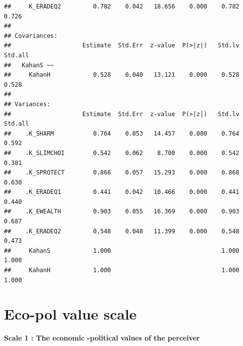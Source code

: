 \documentclass[
]{article}
\begin{document}
\begin{verbatim}
##     K_ERADEQ2         0.782    0.042   18.656    0.000    0.782    0.726
## 
## Covariances:
##                    Estimate  Std.Err  z-value  P(>|z|)   Std.lv  Std.all
##   KahanS ~~                                                             
##     KahanH            0.528    0.040   13.121    0.000    0.528    0.528
## 
## Variances:
##                    Estimate  Std.Err  z-value  P(>|z|)   Std.lv  Std.all
##    .K_SHARM           0.764    0.053   14.457    0.000    0.764    0.592
##    .K_SLIMCHOI        0.542    0.062    8.700    0.000    0.542    0.381
##    .K_SPROTECT        0.868    0.057   15.293    0.000    0.868    0.630
##    .K_ERADEQ1         0.441    0.042   10.466    0.000    0.441    0.440
##    .K_EWEALTH         0.903    0.055   16.369    0.000    0.903    0.687
##    .K_ERADEQ2         0.548    0.048   11.399    0.000    0.548    0.473
##     KahanS            1.000                               1.000    1.000
##     KahanH            1.000                               1.000    1.000
\end{verbatim}

\newpage

\hypertarget{eco-pol-value-scale}{%
\section{Eco-pol value scale}\label{eco-pol-value-scale}}

\textbf{Scale 1 : The economic -political values of the perceiver}
\end{document}
